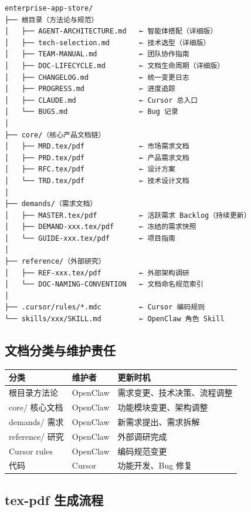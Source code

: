 \documentclass[11pt,a4paper]{article}
\begin{document}
\begin{verbatim}
enterprise-app-store/
├── 根目录（方法论与规范）
│   ├── AGENT-ARCHITECTURE.md   ← 智能体搭配（详细版）
│   ├── tech-selection.md       ← 技术选型（详细版）
│   ├── TEAM-MANUAL.md          ← 团队协作指南
│   ├── DOC-LIFECYCLE.md        ← 文档生命周期（详细版）
│   ├── CHANGELOG.md            ← 统一变更日志
│   ├── PROGRESS.md             ← 进度追踪
│   ├── CLAUDE.md               ← Cursor 总入口
│   └── BUGS.md                 ← Bug 记录
│
├── core/（核心产品文档链）
│   ├── MRD.tex/pdf             ← 市场需求文档
│   ├── PRD.tex/pdf             ← 产品需求文档
│   ├── RFC.tex/pdf             ← 设计方案
│   └── TRD.tex/pdf             ← 技术设计文档
│
├── demands/（需求文档）
│   ├── MASTER.tex/pdf          ← 活跃需求 Backlog（持续更新）
│   ├── DEMAND-xxx.tex/pdf      ← 冻结的需求快照
│   └── GUIDE-xxx.tex/pdf       ← 项目指南
│
├── reference/（外部研究）
│   ├── REF-xxx.tex/pdf         ← 外部架构调研
│   └── DOC-NAMING-CONVENTION   ← 文档命名规范索引
│
├── .cursor/rules/*.mdc         ← Cursor 编码规则
└── skills/xxx/SKILL.md         ← OpenClaw 角色 Skill
\end{verbatim}

\subsection{文档分类与维护责任}

\begin{table}[h]
\centering
\begin{tabularx}{\linewidth}{llX}
\toprule
\textbf{分类} & \textbf{维护者} & \textbf{更新时机} \\
\midrule
根目录方法论 & OpenClaw & 需求变更、技术决策、流程调整 \\
core/ 核心文档 & OpenClaw & 功能模块变更、架构调整 \\
demands/ 需求 & OpenClaw & 新需求提出、需求拆解 \\
reference/ 研究 & OpenClaw & 外部调研完成 \\
Cursor rules & OpenClaw & 编码规范变更 \\
代码 & Cursor & 功能开发、Bug 修复 \\
\bottomrule
\end{tabularx}
\end{table}

\subsection{tex-pdf 生成流程}
\end{document}
